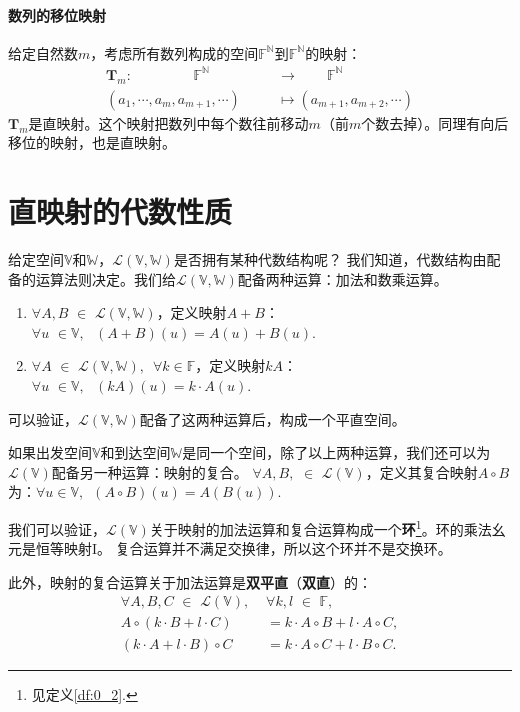 \documentclass[12pt,UTF8,fontset=none]{ctexbook}
\begin{document}
\paragraph{数列的移位映射} 给定自然数$m$，考虑所有数列构成的空间$\mathbb{F}^{\mathbb{N}}$到$\mathbb{F}^{\mathbb{N}}$的映射：
\begin{align*}
    \mathbf{T}_m: \,\, \qquad\qquad\mathbb{F}^{\mathbb{N}}\qquad\qquad & \to \quad\quad \mathbb{F}^{\mathbb{N}}  \\
    (a_1, \cdots, a_m, a_{m+1}, \cdots ) & \mapsto (a_{m+1}, a_{m+2}, \cdots ) 
\end{align*}
$\mathbf{T}_m$是直映射。这个映射把数列中每个数往前移动$m$（前$m$个数去掉）。同理有向后移位的映射，也是直映射。

\section{直映射的代数性质}
给定空间$\mathbb{V}$和$\mathbb{W}$，$\mathcal{L}(\mathbb{V},\mathbb{W})$是否拥有某种代数结构呢？
我们知道，代数结构由配备的运算法则决定。我们给$\mathcal{L}(\mathbb{V},\mathbb{W})$配备两种运算：加法和数乘运算。
\begin{enumerate}
    \item $\forall A, B \,\, \in \,\, \mathcal{L}(\mathbb{V},\mathbb{W})$，定义映射$A+B$： $\forall u \,\, \in \mathbb{V}, \,\,\,\, (A+B)(u) = A(u) + B(u).$
    \item $\forall A \,\, \in \,\, \mathcal{L}(\mathbb{V},\mathbb{W}),  \,\,\, \forall k \in \mathbb{F}$，定义映射$kA$：$\forall u \,\, \in \mathbb{V}, \,\,\,\, (kA)(u) = k\cdot A(u).$
\end{enumerate}
可以验证，$\mathcal{L}(\mathbb{V},\mathbb{W})$配备了这两种运算后，构成一个平直空间。

如果出发空间$\mathbb{V}$和到达空间$\mathbb{W}$是同一个空间，除了以上两种运算，我们还可以为$\mathcal{L}(\mathbb{V})$配备另一种运算：映射的复合。
$\forall A, B, \,\, \in \,\, \mathcal{L}(\mathbb{V})$，定义其复合映射$A\circ B$为：$\forall u \in \mathbb{V}, \,\,\, (A\circ B)(u) = A(B(u)).$

我们可以验证，$\mathcal{L}(\mathbb{V})$关于映射的加法运算和复合运算构成一个\textbf{环}\footnote{见定义\ref{df:0_2}.}。环的乘法幺元是恒等映射$\mathrm{I}$。
复合运算并不满足交换律，所以这个环并不是交换环。

此外，映射的复合运算关于加法运算是\textbf{双平直}（\textbf{双直}）的：
\begin{align*}
    \forall A, B, C \,\, \in \,\, \mathcal{L}(\mathbb{V}), \,\, &\forall k, l \,\, \in \,\, \mathbb{F},  \\
    A\circ(k\cdot B+l\cdot C) &= k\cdot A\circ B + l\cdot A\circ C,  \\
    (k\cdot A+l\cdot B)\circ C &= k\cdot A\circ C + l\cdot B\circ C. 
\end{align*}
\end{document}
